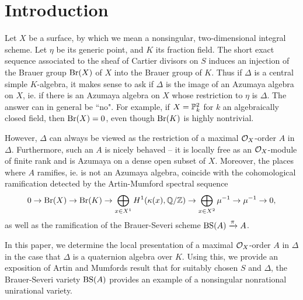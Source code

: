 \section{Introduction}
Let $X$ be a surface, by which we mean a nonsingular, two-dimensional integral scheme.  Let $\eta$ be its generic point, and $K$ its fraction field.  The short exact sequence associated to the sheaf of Cartier divisors on $S$ induces an injection of the Brauer group $\textnormal{Br}(X)$ of $X$ into the Brauer group of $K$.  Thus if $\Delta$ is a central simple $K$-algebra, it makes sense to ask if $\Delta$ is the image of an Azumaya algebra on $X$, ie. if there is an Azumaya algebra on $X$ whose restriction to $\eta$ is $\Delta$.  The answer can in general be ``no".  For example, if $X = \mathbb{P}^2_k$ for $k$ an algebraically closed field, then $\textnormal{Br}(X) = 0$, even though $\textnormal{Br}(K)$ is highly nontrivial.

However, $\Delta$ can always be viewed as the restriction of a maximal $\mathcal{O}_X$-order $A$ in $\Delta$.  Furthermore, such an $A$ is nicely behaved -- it is locally free as an $\mathcal{O}_X$-module of finite rank and is Azumaya on a dense open subset of $X$.  Moreover, the places where $A$ ramifies, ie. is not an Azumaya algebra, coincide with the cohomological ramification detected by the Artin-Mumford spectral sequence
$$0\rightarrow\textnormal{Br}(X)\rightarrow\textnormal{Br}(K)\rightarrow\bigoplus_{x\in X^1}H^1(\kappa(x),\mathbb{Q}/\mathbb{Z})\rightarrow \bigoplus_{x\in X^2}\mu^{-1}\rightarrow\mu^{-1}\rightarrow 0,$$
as well as the ramification of the Brauer-Severi scheme $\textnormal{BS}(A)\xrightarrow{\pi}A$.

In this paper, we determine the local presentation of a maximal $\mathcal{O}_X$-order $A$ in $\Delta$ in the case that $\Delta$ is a quaternion algebra over $K$.  Using this, we provide an exposition of Artin and Mumfords result that for suitably chosen $S$ and $\Delta$, the Brauer-Severi variety $\textnormal{BS}(A)$ provides an example of a nonsingular nonrational unirational variety.

